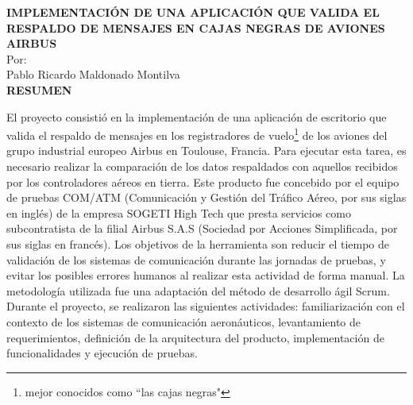 \setcounter{page}{5}
\begin{center}

{\bfseries IMPLEMENTACIÓN DE UNA APLICACIÓN QUE VALIDA EL RESPALDO DE MENSAJES EN CAJAS NEGRAS DE AVIONES AIRBUS\\}
\bigskip
Por: \\ Pablo Ricardo Maldonado Montilva\\
\bigskip
\bigskip
{\bf RESUMEN}  %
\end{center}	

El proyecto consistió en la implementación de una aplicación de escritorio que valida el respaldo de mensajes en los registradores de vuelo\footnote{mejor conocidos como ``las cajas negras"} de los aviones del grupo industrial europeo Airbus en Toulouse, Francia. Para ejecutar esta tarea, es necesario realizar la comparación de los datos respaldados con aquellos recibidos por los controladores aéreos en tierra. Este producto fue concebido por el equipo de pruebas COM/ATM (Comunicación y Gestión del Tráfico Aéreo, por sus siglas en inglés) de la empresa SOGETI High Tech que presta servicios como subcontratista de la filial Airbus S.A.S (Sociedad por Acciones Simplificada, por sus siglas en francés). Los objetivos de la herramienta son reducir el tiempo de validación de los sistemas de comunicación durante las jornadas de pruebas, y evitar los posibles errores humanos al realizar esta actividad de forma manual. La metodología utilizada fue una adaptación del método de desarrollo ágil Scrum. Durante el proyecto, se realizaron las siguientes actividades: familiarización con el contexto de los sistemas de comunicación aeronáuticos, levantamiento de requerimientos, definición de la arquitectura del producto, implementación de funcionalidades y ejecución de pruebas.  